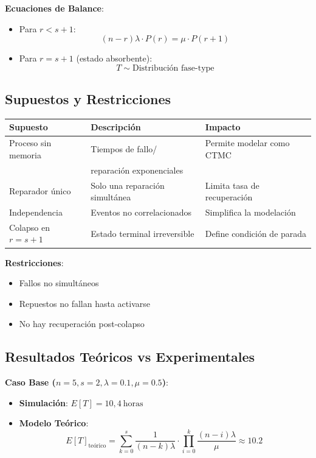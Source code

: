 \documentclass[a4paper, 12pt]{article}
\begin{document}
\textbf{Ecuaciones de Balance}:
\begin{itemize}
    \item Para \( r < s+1 \):
    \begin{equation}
        (n - r)\lambda \cdot P(r) = \mu \cdot P(r+1)
    \end{equation}
    \item Para \( r = s+1 \) (estado absorbente):
    \begin{equation}
        T \sim \text{Distribución fase-type}
    \end{equation}
\end{itemize}

\subsection{Supuestos y Restricciones}
\begin{tabular}{|p{5cm}|p{5cm}|p{5cm}|}
    \hline
    \textbf{Supuesto} & \textbf{Descripción} & \textbf{Impacto} \\
    \hline
    Proceso sin memoria & Tiempos de fallo/ & Permite modelar como CTMC \\
    & reparación exponenciales & \\
    \hline
    Reparador único & Solo una reparación simultánea & Limita tasa de recuperación \\
    \hline
    Independencia & Eventos no correlacionados & Simplifica la modelación \\
    \hline
    Colapso en \( r = s+1 \) & Estado terminal irreversible & Define condición de parada \\
    \hline
\end{tabular}

\textbf{Restricciones}:
\begin{itemize}
    \item Fallos no simultáneos
    \item Repuestos no fallan hasta activarse
    \item No hay recuperación post-colapso
\end{itemize}

\subsection{Resultados Teóricos vs Experimentales}
\textbf{Caso Base (\( n=5, s=2, \lambda=0.1, \mu=0.5 \))}:
\begin{itemize}
    \item \textbf{Simulación}: \( E[T] = 10,4 \ \text{horas} \)
    \item \textbf{Modelo Teórico}:
    \begin{equation}
        E[T]_{\text{teórico}} = \sum_{k=0}^{s} \frac{1}{(n - k)\lambda} \cdot \prod_{i=0}^k \frac{(n - i)\lambda}{\mu} \approx 10.2\  
    \end{equation}
\end{itemize}
\end{document}
